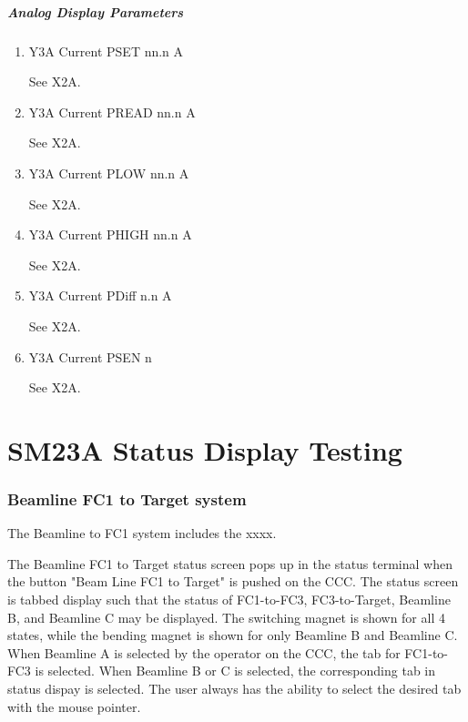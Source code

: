 \documentclass[11pt]{book}		%
\begin{document}
\paragraph{Analog Display Parameters}

\begin{enumerate}
 \item Y3A Current PSET   nn.n A

\color{red}
See X2A.
\color{black}

 \item Y3A Current PREAD  nn.n A

\color{red}
See X2A.
\color{black}

 \item Y3A Current PLOW   nn.n A

\color{red}
See X2A.
\color{black}

 \item Y3A Current PHIGH  nn.n A

\color{red}
See X2A.
\color{black}

 \item Y3A Current PDiff n.n A

\color{red}
See X2A.
\color{black}

 \item Y3A Current PSEN  n

\color{red}
See X2A.
\color{black}

\end{enumerate}





\chapter{SM23A Status Display Testing}

\subsection{Beamline FC1 to Target system} \label{sect:cyc-op-interface-status-terminal-display-contents-beamline-target}

The Beamline to FC1 system includes the xxxx.

The Beamline FC1 to Target status screen pops up in the status terminal when the button "Beam Line FC1 to Target" is pushed on the CCC. The status screen is tabbed display such that the status of FC1-to-FC3, FC3-to-Target, Beamline B, and Beamline C may be displayed.  The switching magnet is shown for all 4 states, while the bending magnet is shown for only Beamline B and Beamline C.  When Beamline A is selected by the operator on the CCC, the tab for FC1-to-FC3 is selected. When Beamline B or C is selected, the corresponding tab in status dispay is selected. The user always has the ability to select the desired tab with the mouse pointer.
\end{document}
